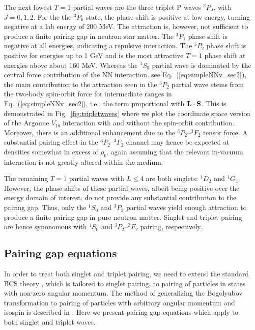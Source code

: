 \documentclass[preprint,rmp,aps,floatfix]{revtex4}
\begin{document}
The next lowest $T=1$ partial waves are the three triplet 
P waves $^3P_J$, with $J=0,1,2$.
For the the $^3P_0$ state, the
phase shift is positive  at low energy, turning
negative  at a lab energy of 200 MeV. The attraction is, however,
not sufficient to produce a finite pairing gap
in neutron star matter. The $^3P_1$ phase
shift is negative  at all energies, indicating a repulsive 
interaction.  The
$^3P_2$ phase shift is positive for energies up to 1 GeV and 
is the most attractive $T=1$ phase shift at energies above
about 160 MeV.  
Whereas the $^1S_0$ partial wave is dominated by the central force 
contribution of the NN interaction, see Eq.~(\ref{eq:simpleNNv_sec2}),
the main contribution to the attraction seen in the  
$^3P_2$ partial wave stems from the two-body spin-orbit force
for intermediate ranges
in Eq.~(\ref{eq:simpleNNv_sec2}), i.e., the term proportional with
${\bf L}\cdot {\bf S}$. This is demonstrated in 
Fig.~\ref{fig:tripletwaves} where we plot the coordinate space
version of the Argonne $V_{18}$ interaction \cite{v18} 
with and without the
spin-orbit contribution. Moreover, there is an additional enhancement
due to the $^3P_2$--$^3F_2$ tensor force.  
A substantial pairing effect in the
$^3P_2$--$^3F_2$ channel may hence be expected at densities somewhat 
in excess of $\rho_0$, again assuming that the relevant in-vacuum 
interaction is not greatly altered within the medium.  


The remaining $T=1$ partial waves with $L\leq 4$ are both
singlets: $^1D_2$ and $^1G_4$.  However, the phase shifts of
these partial waves, albeit being positive over the energy domain of interest,
do not provide any substantial contribution to the pairing gap.
Thus, 
only the $^1S_0$ and $^3P_2$ partial waves yield enough attraction
to produce a finite pairing gap in pure neutron matter.
Singlet and triplet pairing are hence synonomous with 
$^1S_0$ and $^3P_2$--$^3F_2$ pairing, respectively.

\subsection{Pairing gap equations}

In order to treat both singlet and triplet pairing, we need to extend
the standard BCS theory \cite{bcs_theory,cms59}, which is tailored to singlet
pairing, to 
pairing of particles in states with non-zero angular momentum.  
The method 
of generalizing the Bogolyubov transformation to pairing of particles 
with arbitrary angular momentum and isospin is described in 
\cite{tam70,taka93}.
Here we present pairing gap equations which apply to both singlet and
triplet waves.
\end{document}
